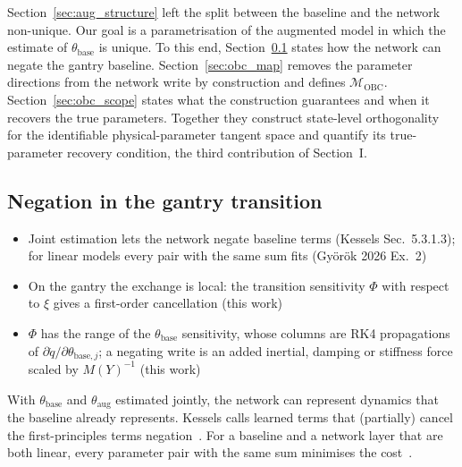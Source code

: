 Section~\ref{sec:aug_structure} left the split between the baseline and the
network non-unique.
Our goal is a parametrisation of the augmented model in which the estimate of
$\theta_{\mathrm{base}}$ is unique.
To this end, Section~\ref{sec:obc_negation} states how the network can
negate the gantry baseline.
Section~\ref{sec:obc_map} removes the parameter directions from the network
write by construction and defines $\mathcal M_{\mathrm{OBC}}$.
Section~\ref{sec:obc_scope} states what the construction guarantees and when
it recovers the true parameters.
Together they construct state-level orthogonality for the identifiable
physical-parameter tangent space and quantify its true-parameter recovery
condition, the third contribution of Section~I.

\subsection{Negation in the gantry transition}\label{sec:obc_negation}
\ifdraft
\begin{itemize}
\item Joint estimation lets the network negate baseline terms (Kessels Sec.~5.3.1.3); for linear models every pair with the same sum fits (Gy\"or\"ok 2026 Ex.~2)
\item On the gantry the exchange is local: the transition sensitivity $\Phi$ with respect to $\xi$ gives a first-order cancellation (this work)
\item $\Phi$ has the range of the $\theta_{\mathrm{base}}$ sensitivity, whose columns are RK4 propagations of $\partial\ddot q/\partial\theta_{\mathrm{base},j}$; a negating write is an added inertial, damping or stiffness force scaled by $M(Y)^{-1}$ (this work)
\end{itemize}
\fi

With $\theta_{\mathrm{base}}$ and $\theta_{\mathrm{aug}}$ estimated jointly,
the network can represent dynamics that the baseline already represents.
Kessels calls learned terms that (partially) cancel the first-principles terms
negation~\cite[Sec.~5.3.1.3]{kessels2025ai}.
For a baseline and a network layer that are both linear, every parameter pair
with the same sum minimises the cost~\cite[Ex.~2]{gyorok2026obc}.

